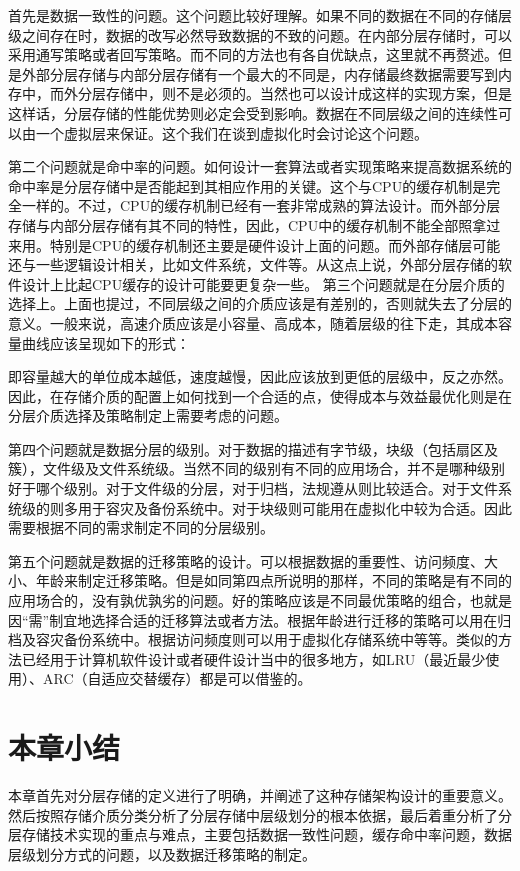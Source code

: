 首先是数据一致性的问题。这个问题比较好理解。如果不同的数据在不同的存储层级之间存在时，数据的改写必然导致数据的不致的问题。在内部分层存储时，可以采用通写策略或者回写策略。而不同的方法也有各自优缺点，这里就不再赘述。但是外部分层存储与内部分层存储有一个最大的不同是，内存储最终数据需要写到内存中，而外分层存储中，则不是必须的。当然也可以设计成这样的实现方案，但是这样话，分层存储的性能优势则必定会受到影响。数据在不同层级之间的连续性可以由一个虚拟层来保证。这个我们在谈到虚拟化时会讨论这个问题。

第二个问题就是命中率的问题。如何设计一套算法或者实现策略来提高数据系统的命中率是分层存储中是否能起到其相应作用的关键。这个与CPU的缓存机制是完全一样的。不过，CPU的缓存机制已经有一套非常成熟的算法设计。而外部分层存储与内部分层存储有其不同的特性，因此，CPU中的缓存机制不能全部照拿过来用。特别是CPU的缓存机制还主要是硬件设计上面的问题。而外部存储层可能还与一些逻辑设计相关，比如文件系统，文件等。从这点上说，外部分层存储的软件设计上比起CPU缓存的设计可能要更复杂一些。
第三个问题就是在分层介质的选择上。上面也提过，不同层级之间的介质应该是有差别的，否则就失去了分层的意义。一般来说，高速介质应该是小容量、高成本，随着层级的往下走，其成本容量曲线应该呈现如下的形式：

即容量越大的单位成本越低，速度越慢，因此应该放到更低的层级中，反之亦然。因此，在存储介质的配置上如何找到一个合适的点，使得成本与效益最优化则是在分层介质选择及策略制定上需要考虑的问题。

第四个问题就是数据分层的级别。对于数据的描述有字节级，块级（包括扇区及簇），文件级及文件系统级。当然不同的级别有不同的应用场合，并不是哪种级别好于哪个级别。对于文件级的分层，对于归档，法规遵从则比较适合。对于文件系统级的则多用于容灾及备份系统中。对于块级则可能用在虚拟化中较为合适。因此需要根据不同的需求制定不同的分层级别。

第五个问题就是数据的迁移策略的设计。可以根据数据的重要性、访问频度、大小、年龄来制定迁移策略。但是如同第四点所说明的那样，不同的策略是有不同的应用场合的，没有孰优孰劣的问题。好的策略应该是不同最优策略的组合，也就是因“需”制宜地选择合适的迁移算法或者方法。根据年龄进行迁移的策略可以用在归档及容灾备份系统中。根据访问频度则可以用于虚拟化存储系统中等等。类似的方法已经用于计算机软件设计或者硬件设计当中的很多地方，如LRU（最近最少使用）、ARC（自适应交替缓存）都是可以借鉴的。

\section{本章小结}
本章首先对分层存储的定义进行了明确，并阐述了这种存储架构设计的重要意义。然后按照存储介质分类分析了分层存储中层级划分的根本依据，最后着重分析了分层存储技术实现的重点与难点，主要包括数据一致性问题，缓存命中率问题，数据层级划分方式的问题，以及数据迁移策略的制定。
